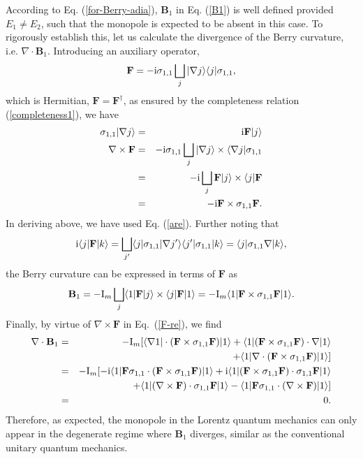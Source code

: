 \documentclass[pra,epsfig,rotate,superscriptaddress,showpacs]{revtex4}
\begin{document}
According to Eq. (\ref{for-Berry-adia}), $\mathbf{B}_1$ in Eq. (\ref{B1}) is well defined provided $E_1\neq E_2$, such that the monopole is expected to be absent in this case. To rigorously establish this,  let us calculate the divergence of the Berry curvature, i.e. $\nabla \cdot \mathbf{B}_1$. Introducing an auxiliary operator,
\begin{equation}
\mathbf{F}=-{\text i}\sigma_{1,1}\bigsqcup_j|\nabla j\rangle\langle j|\sigma_{1,1},
\end{equation}
which is Hermitian, $\mathbf{F}=\mathbf{F}^\dag$, as ensured by the completeness relation (\ref{completeness1}), we have
\begin{eqnarray}  \label{F-re} \nonumber
\sigma_{1,1}|\nabla j\rangle&=&{\text i}\mathbf{F}|j\rangle \\ \nonumber
\nabla\times\mathbf{F}&=&-{\text i}\sigma_{1,1}\bigsqcup_j|\nabla j\rangle\times\langle \nabla j|\sigma_{1,1} \\ \nonumber
&=&-{\text i}\bigsqcup_j\mathbf{F}|j\rangle\times\langle j|\mathbf{F} \\
&=&-{\text i}\mathbf{F}\times\sigma_{1,1}\mathbf{F}.
\end{eqnarray}
In deriving above, we have used Eq. (\ref{are}).  Further noting that
\begin{equation}
{\text i}\langle j|\mathbf{F}|k\rangle=\bigsqcup_{j'}\langle j|\sigma_{1,1}|\nabla j'\rangle\langle j'|\sigma_{1,1}|k\rangle=\langle j|\sigma_{1,1}\nabla|k\rangle,
\end{equation}
the Berry curvature can be expressed in terms of $\mathbf{F}$ as
\begin{equation} 
\mathbf{B}_1=-{\text I_m} \bigsqcup_j \langle1|\mathbf{F}|j\rangle\times\langle j|\mathbf{F}|1\rangle
=-{\text I_m}\langle1|\mathbf{F}\times\sigma_{1,1}\mathbf{F}|1\rangle.
\end{equation}
Finally, by virtue of $\nabla\times\mathbf{F}$ in Eq.~(\ref{F-re}), we find
\begin{eqnarray} \nonumber
\nabla\cdot\mathbf{B}_1&=&-{\text I_m}[\langle\nabla1|\cdot(\mathbf{F}\times\sigma_{1,1}\mathbf{F})|1\rangle+
\langle1|(\mathbf{F}\times\sigma_{1,1}\mathbf{F})\cdot\nabla|1\rangle \\ \nonumber
&&+\langle1|\nabla\cdot(\mathbf{F}\times\sigma_{1,1}\mathbf{F})|1\rangle] \\ \nonumber
&=&-{\text I_m}[-{\text i}\langle1|\mathbf{F}\sigma_{1,1}\cdot(\mathbf{F}\times\sigma_{1,1}\mathbf{F})|1\rangle+{\text i}\langle1|(\mathbf{F}\times\sigma_{1,1}\mathbf{F})\cdot\sigma_{1,1}\mathbf{F}|1\rangle \\ \nonumber
&&+\langle1|(\nabla\times\mathbf{F})\cdot\sigma_{1,1}\mathbf{F}|1\rangle-\langle1|\mathbf{F}\sigma_{1,1}\cdot(\nabla\times\mathbf{F})|1\rangle ] \\ \nonumber
&=&0.
\end{eqnarray}
Therefore, as expected, the monopole in the Lorentz quantum mechanics can only appear in the degenerate regime where $\mathbf{B}_1$ diverges, similar as the conventional unitary quantum mechanics.
\end{document}

